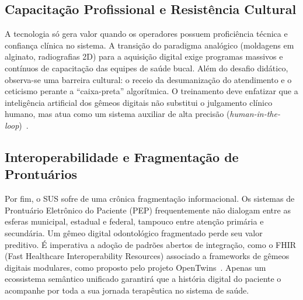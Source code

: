 \subsection{Capacitação Profissional e Resistência Cultural}
A tecnologia só gera valor quando os operadores possuem proficiência técnica e confiança clínica no sistema. A transição do paradigma analógico (moldagens em alginato, radiografias 2D) para a aquisição digital exige programas massivos e contínuos de capacitação das equipes de saúde bucal. Além do desafio didático, observa-se uma barreira cultural: o receio da desumanização do atendimento e o ceticismo perante a ``caixa-preta'' algorítmica. O treinamento deve enfatizar que a inteligência artificial dos gêmeos digitais não substitui o julgamento clínico humano, mas atua como um sistema auxiliar de alta precisão (\textit{human-in-the-loop})~\cite{roy2025editorial}.

\subsection{Interoperabilidade e Fragmentação de Prontuários}
Por fim, o SUS sofre de uma crônica fragmentação informacional. Os sistemas de Prontuário Eletrônico do Paciente (PEP) frequentemente não dialogam entre as esferas municipal, estadual e federal, tampouco entre atenção primária e secundária. Um gêmeo digital odontológico fragmentado perde seu valor preditivo. É imperativa a adoção de padrões abertos de integração, como o FHIR (Fast Healthcare Interoperability Resources) associado a frameworks de gêmeos digitais modulares, como proposto pelo projeto OpenTwins~\cite{infante2025distributed}. Apenas um ecossistema semântico unificado garantirá que a história digital do paciente o acompanhe por toda a sua jornada terapêutica no sistema de saúde.

